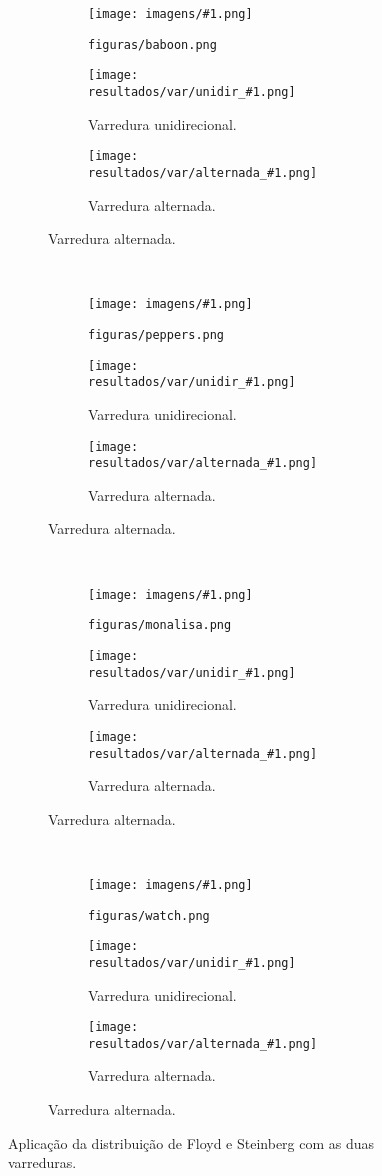 \newcommand{\imagem}[1]{
    \begin{subfigure}{\textwidth}
        \centering
        \begin{subfigure}{0.32\textwidth}
            \centering
            \texttt{[image: imagens/\#1.png]}
            \caption{\texttt{figuras/#1.png}}
        \end{subfigure}%
        \begin{subfigure}{0.32\textwidth}
            \centering
            \texttt{[image: resultados/var/unidir\_\#1.png]}
            \caption{Varredura unidirecional.}
        \end{subfigure}%
        \begin{subfigure}{0.32\textwidth}
            \centering
            \texttt{[image: resultados/var/alternada\_\#1.png]}
            \caption{Varredura alternada.}
        \end{subfigure}
    \end{subfigure}
}

\begin{figure}[H]
    \centering
    \imagem{baboon}\\[8pt]
    \imagem{peppers}\\[8pt]
    \imagem{monalisa}\\[8pt]
    \imagem{watch}

    \caption{Aplicação da distribuição de Floyd e Steinberg com as duas varreduras.}
\end{figure}